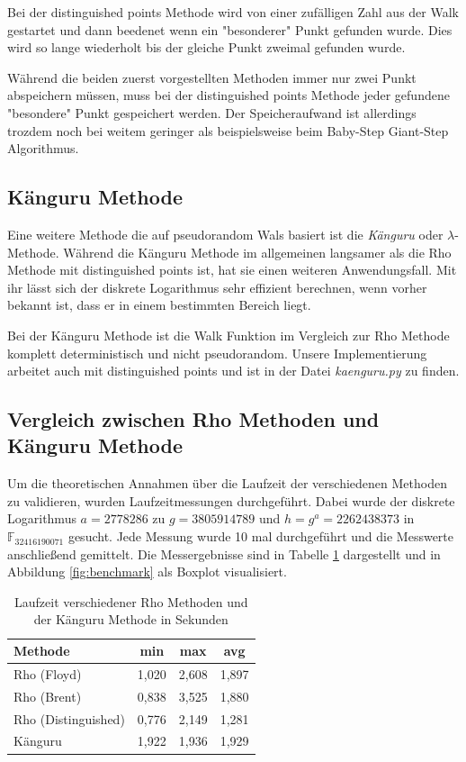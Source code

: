 \documentclass{scrartcl}
\begin{document}
Bei der distinguished points Methode wird von einer zufälligen Zahl aus
der Walk gestartet und dann beedenet wenn ein "besonderer" Punkt
gefunden wurde.
Dies wird so lange wiederholt bis der gleiche Punkt zweimal gefunden wurde.

Während die beiden zuerst vorgestellten Methoden immer nur zwei Punkt abspeichern müssen,
muss bei der distinguished points Methode jeder gefundene "besondere" Punkt gespeichert werden.
Der Speicheraufwand ist allerdings trozdem noch bei weitem geringer als beispielsweise beim
Baby-Step Giant-Step Algorithmus.
\cite{VanOorschot1999}

\subsection{Känguru Methode}
\label{sec:kaenguru}
Eine weitere Methode die auf pseudorandom Wals basiert ist die
\emph{Känguru} oder \(\lambda\)-Methode.
Während die Känguru Methode im allgemeinen langsamer als die Rho
Methode mit distinguished points ist, hat sie einen weiteren Anwendungsfall.
Mit ihr lässt sich der diskrete Logarithmus sehr effizient berechnen,
wenn vorher bekannt ist, dass er in einem bestimmten Bereich liegt.

Bei der Känguru Methode ist die Walk Funktion im Vergleich zur Rho Methode
komplett deterministisch und nicht pseudorandom.
Unsere Implementierung arbeitet auch mit distinguished points und ist in
der Datei \emph{kaenguru.py} zu finden.
\cite{Galbraith2012}

\subsection{Vergleich zwischen Rho Methoden und Känguru Methode}
Um die theoretischen Annahmen über die Laufzeit der verschiedenen Methoden
zu validieren, wurden Laufzeitmessungen durchgeführt.
Dabei wurde der diskrete Logarithmus \( a = 2778286 \) zu \( g = 3805914789 \)
und \(h = g^a = 2262438373 \) in \( \mathbb{F}_{32416190071} \) gesucht.
Jede Messung wurde 10 mal durchgeführt und die Messwerte anschließend gemittelt.
Die Messergebnisse sind in Tabelle \ref{tab:benchmark} dargestellt und
in Abbildung \ref{fig:benchmark} als Boxplot visualisiert.

\begin{table}[h]
  \centering
  \begin{tabular}{l|c|c|c}
    Methode             & min   & max   & avg   \\ \hline
    Rho (Floyd)         & 1,020 & 2,608 & 1,897  \\ \hline
    Rho (Brent)         & 0,838 & 3,525 & 1,880 \\ \hline
    Rho (Distinguished) & 0,776 & 2,149 & 1,281 \\ \hline
    Känguru             & 1,922 & 1,936 & 1,929
    \end{tabular}
  \caption{Laufzeit verschiedener Rho Methoden und der Känguru Methode in Sekunden}
  \label{tab:benchmark}
\end{table}
\end{document}
